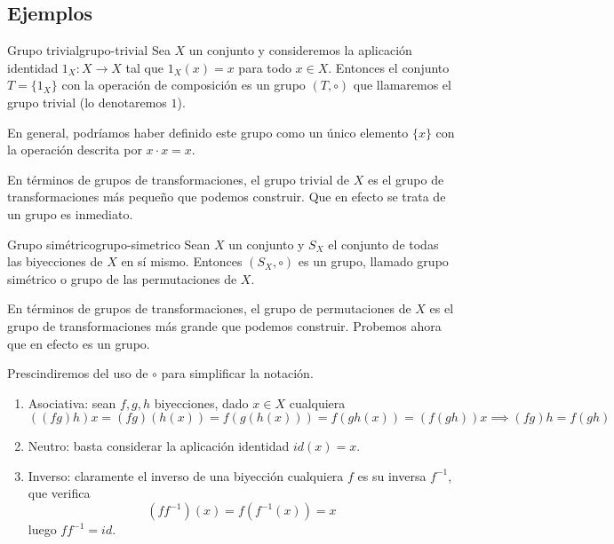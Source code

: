\subsection{Ejemplos}

\begin{example}{Grupo trivial}{grupo-trivial}
    Sea \(X\) un conjunto y consideremos la aplicación identidad $1_X: X \to X$ tal que $1_X(x) = x$ para todo $x \in X$. Entonces el conjunto $T = \{1_X\}$ con la operación de composición es un grupo $(T, \circ)$ que llamaremos el grupo trivial (lo denotaremos $1$).
    
    En general, podríamos haber definido este grupo como un único elemento $\{x\}$ con la operación descrita por $x \cdot x = x$.
\end{example}

En términos de grupos de transformaciones, el grupo trivial de $X$ es el grupo de transformaciones más pequeño que podemos construir. Que en efecto se trata de un grupo es inmediato.

\begin{example}{Grupo simétrico}{grupo-simetrico}
    Sean \(X\) un conjunto y \(S_X\) el conjunto de todas las biyecciones de \(X\) en sí mismo. Entonces \((S_X, \circ)\) es un grupo, llamado {grupo simétrico} o {grupo de las permutaciones} de \(X\).
\end{example}

En términos de grupos de transformaciones, el grupo de permutaciones de $X$ es el grupo de transformaciones más grande que podemos construir. Probemos ahora que en efecto es un grupo.

\begin{proofbox}
    Prescindiremos del uso de $\circ$ para simplificar la notación.
    \begin{enumerate}
        \item Asociativa: sean $f,g,h$ biyecciones, dado $x \in X$ cualquiera
        \[
            ((fg)h) x = (fg)(h(x)) = f(g(h(x))) = f(gh(x)) = (f(gh))x \implies (fg)h = f(gh)
        \]
        \item Neutro: basta considerar la aplicación identidad $id(x) = x$.
        \item Inverso: claramente el inverso de una biyección cualquiera $f$ es su inversa $f^{-1}$, que verifica
        \[
        (f f^{-1})(x) = f(f^{-1}(x)) = x
        \]
        luego $ff^{-1} = id$.
    \end{enumerate}
\end{proofbox}

